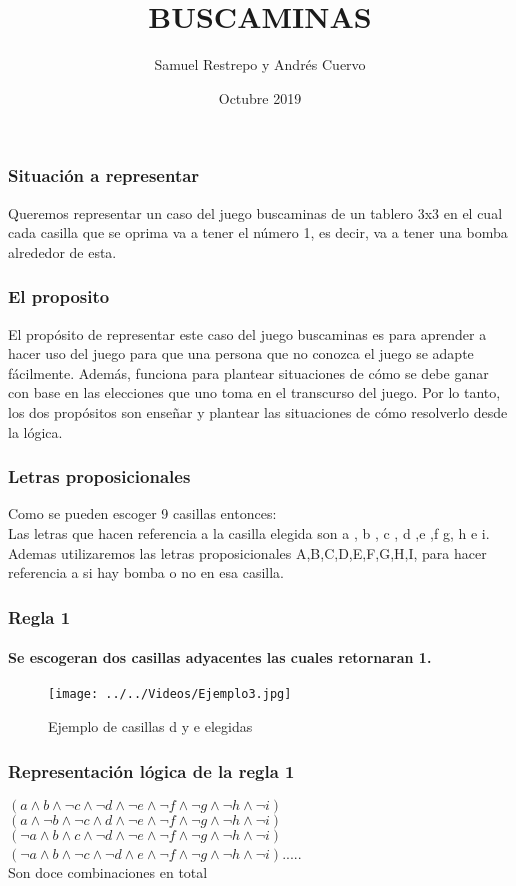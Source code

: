 \documentclass{beamer}
\title{BUSCAMINAS}
\author{Samuel Restrepo y Andrés Cuervo}
\date{Octubre 2019}
\begin{document}
\begin{frame}
\titlepage
\end{frame}

\begin{frame}
\frametitle{Situación a representar}
Queremos representar un caso del juego buscaminas de un tablero 3x3 en el cual cada casilla que se oprima va a tener el número 1, es decir, va a tener una bomba alrededor de esta.
\end{frame}

\begin{frame}
\frametitle{El proposito}
El propósito de representar este caso del juego buscaminas es para aprender a hacer uso del juego para que una persona que no conozca el juego se adapte fácilmente. Además, funciona para plantear situaciones de cómo se debe ganar con base en las elecciones que uno toma en el transcurso del juego. Por lo tanto, los dos propósitos son enseñar y plantear las situaciones de cómo resolverlo desde la lógica.
\end{frame}

\begin{frame}
\frametitle{Letras proposicionales}
Como se pueden escoger 9 casillas entonces:\\
Las letras que hacen referencia a la casilla elegida son a , b , c , d ,e ,f g, h e i.
Ademas utilizaremos las letras proposicionales A,B,C,D,E,F,G,H,I, para hacer referencia a si hay bomba o no en esa casilla.
\end{frame}

\begin{frame}
\frametitle{Regla 1}
\framesubtitle{Se escogeran dos casillas adyacentes las cuales retornaran 1.
}

\begin{figure}[hbtp]
\centering
\texttt{[image: ../../Videos/Ejemplo3.jpg]} 
\caption{Ejemplo de casillas d y e elegidas}
\end{figure}
\end{frame}



\begin{frame}
\frametitle{Representación lógica de la regla 1}

$(a\wedge{b}\wedge{\neg{c}}\wedge{\neg{d}}\wedge{\neg{e}}\wedge{\neg{f}}\wedge{\neg{g}}\wedge{\neg{h}}\wedge{\neg{i}})$\\
$(a\wedge{\neg{b}}\wedge{\neg{c}}\wedge{d}\wedge{\neg{e}}\wedge{\neg{f}}\wedge{\neg{g}}\wedge{\neg{h}}\wedge{\neg{i}})$\\
$(\neg{a}\wedge{b}\wedge{c}\wedge{\neg{d}}\wedge{\neg{e}}\wedge{\neg{f}}\wedge{\neg{g}}\wedge{\neg{h}}\wedge{\neg{i}})$\\
$(\neg{a}\wedge{b}\wedge{\neg{c}}\wedge{\neg{d}}\wedge{e}\wedge{\neg{f}}\wedge{\neg{g}}\wedge{\neg{h}}\wedge{\neg{i}})$.....\\
Son doce combinaciones en total
\end{frame}
\end{document}
